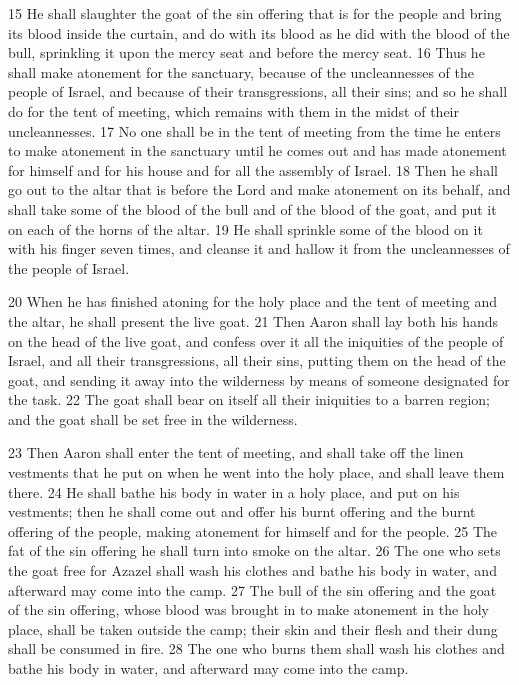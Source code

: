 15 He shall slaughter the goat of the sin offering that is for the people and 
bring its blood inside the curtain, and do with its blood as he did with the 
blood of the bull, sprinkling it upon the mercy seat and before the mercy 
seat. 16 Thus he shall make atonement for the sanctuary, because of the 
uncleannesses of the people of Israel, and because of their transgressions, all 
their sins; and so he shall do for the tent of meeting, which remains with them 
in the midst of their uncleannesses. 17 No one shall be in the tent of meeting 
from the time he enters to make atonement in the sanctuary until he comes out 
and has made atonement for himself and for his house and for all the assembly of
Israel. 18 Then he shall go out to the altar that is before the Lord and make 
atonement on its behalf, and shall take some of the blood of the bull and of 
the blood of the goat, and put it on each of the horns of the altar. 19 He 
shall sprinkle some of the blood on it with his finger seven times, and cleanse
it and hallow it from the uncleannesses of the people of Israel.

20 When he has finished atoning for the holy place and the tent of meeting and 
the altar, he shall present the live goat. 21 Then Aaron shall lay both his 
hands on the head of the live goat, and confess over it all the iniquities of the
people of Israel, and all their transgressions, all their sins, putting them on 
the head of the goat, and sending it away into the wilderness by means of someone 
designated for the task. 22 The goat shall bear on itself all their iniquities 
to a barren region; and the goat shall be set free in the wilderness.

23 Then Aaron shall enter the tent of meeting, and shall take off the linen 
vestments that he put on when he went into the holy place, and shall leave them 
there. 24 He shall bathe his body in water in a holy place, and put on his 
vestments; then he shall come out and offer his burnt offering and the burnt 
offering of the people, making atonement for himself and for the people. 25 The
fat of the sin offering he shall turn into smoke on the altar. 26 The one who 
sets the goat free for Azazel shall wash his clothes and bathe his body in 
water, and afterward may come into the camp. 27 The bull of the sin offering and
the goat of the sin offering, whose blood was brought in to make atonement in 
the holy place, shall be taken outside the camp; their skin and their flesh and 
their dung shall be consumed in fire. 28 The one who burns them shall wash his 
clothes and bathe his body in water, and afterward may come into the camp.

